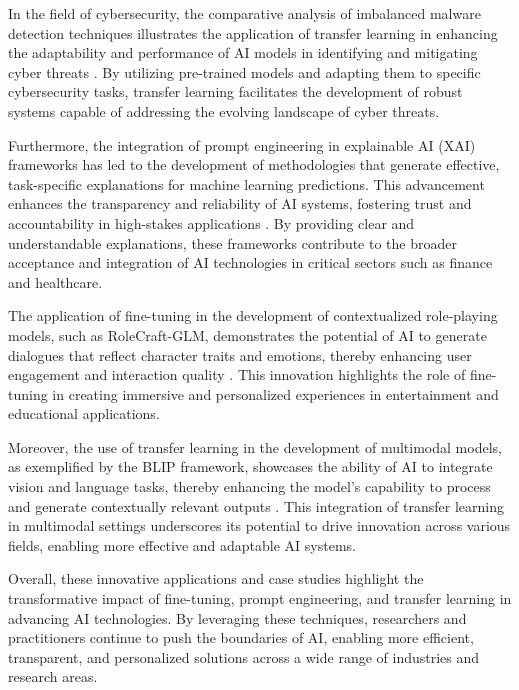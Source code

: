 In the field of cybersecurity, the comparative analysis of imbalanced malware detection techniques illustrates the application of transfer learning in enhancing the adaptability and performance of AI models in identifying and mitigating cyber threats \cite{m2023comparativeanalysisimbalancedmalware}. By utilizing pre-trained models and adapting them to specific cybersecurity tasks, transfer learning facilitates the development of robust systems capable of addressing the evolving landscape of cyber threats.



Furthermore, the integration of prompt engineering in explainable AI (XAI) frameworks has led to the development of methodologies that generate effective, task-specific explanations for machine learning predictions. This advancement enhances the transparency and reliability of AI systems, fostering trust and accountability in high-stakes applications . By providing clear and understandable explanations, these frameworks contribute to the broader acceptance and integration of AI technologies in critical sectors such as finance and healthcare.



The application of fine-tuning in the development of contextualized role-playing models, such as RoleCraft-GLM, demonstrates the potential of AI to generate dialogues that reflect character traits and emotions, thereby enhancing user engagement and interaction quality \cite{tao2024rolecraftglmadvancingpersonalizedroleplaying}. This innovation highlights the role of fine-tuning in creating immersive and personalized experiences in entertainment and educational applications.



Moreover, the use of transfer learning in the development of multimodal models, as exemplified by the BLIP framework, showcases the ability of AI to integrate vision and language tasks, thereby enhancing the model's capability to process and generate contextually relevant outputs \cite{BLIP:Boots3}. This integration of transfer learning in multimodal settings underscores its potential to drive innovation across various fields, enabling more effective and adaptable AI systems.



Overall, these innovative applications and case studies highlight the transformative impact of fine-tuning, prompt engineering, and transfer learning in advancing AI technologies. By leveraging these techniques, researchers and practitioners continue to push the boundaries of AI, enabling more efficient, transparent, and personalized solutions across a wide range of industries and research areas.













